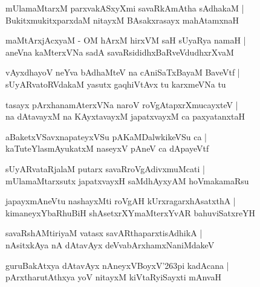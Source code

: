 \documentclass[twoside,12pt,openright]{book}
\def\S{\char'263}
\newcounter{shloka}[chapter]
\begin{document}
\begin{shloka}%
mUlamaMtarxM parxvakASxyXmi savaRkAmAtha sAdhakaM |\\
BukitxmukitxparxdaM nitayxM BAsakxrasayx mahAtamxnaH 
\end{shloka}

\begin{shloka}%
maMtArxjAcxyaM - OM hArxM hirxVM saH sUyaRya namaH |\\
aneVna kaMterxVNa sadA savaRsididhxBaRveVdudhxrXvaM 	
\end{shloka}

\begin{shloka}%
vAyxdhayoV neYva bAdhaMteV na cAniSaTxBayaM BaveVtf |\\
sUyARvatoRVdakaM yasutx gaqhiVtAvx tu karxmeVNa tu 
\end{shloka}

\begin{shloka}%
tasayx pArxhanamAterxVNa naroV roVgAtapxrXmucayxteV |\\
na dAtavayxM na KAyxtavayxM japatxvayxM ca paxyatanxtaH 
\end{shloka}

\begin{shloka}%
aBaketxVSavxnapateyxVSu pAKaMDalwkikeVSu ca |\\
kaTuteYlasmAyukatxM naseyxV pAneV ca dApayeVtf 
\end{shloka}

\begin{shloka}%
sUyARvataRjalaM putarx savaRroVgAdivxmuMcati |\\
mUlamaMtarxsutx japatxvayxH saMdhAyxyAM hoVmakamaRsu 
\end{shloka}

\begin{shloka}%
japayxmAneVtu nashayxMti roVgAH kUrxragarxhAsatxthA |\\
kimaneyxYbaRhuBiH shAsetxrXYmaMterxYvAR bahuviSatxreYH
\end{shloka}

\begin{shloka}%
savaRshAMtiriyaM vatasx savARthaparxtisAdhikA |\\
nAsitxkAya nA dAtavAyx deVvabArxhamxNaniMdakeV 
\end{shloka}

\begin{shloka}%
guruBakAtxya dAtavAyx nAneyxVBoyxV\S pi kadAcana |\\
pArxtharutAthxya yoV nitayxM kiVtaRyiSayxti mAnvaH 
\end{shloka}
\end{document}
